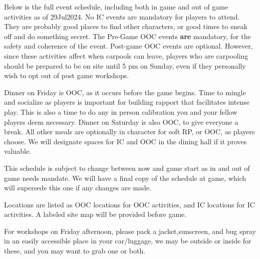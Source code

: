 \documentclass[green]{GL2020}
\begin{document}
\name{\gWeekendSchedule{}}

Below is the full event schedule, including both in game and out of game activities as of 29Jul2024. No IC events are mandatory for players to attend. They are probably good places to find other characters, or good times to sneak off and do something secret. The Pre-Game OOC events \textbf{are} mandatory, for the safety and coherence of the event. Post-game OOC events are optional. However, since these activities affect when carpools can leave, players who are carpooling should be prepared to be on site until 5 pm on Sunday, even if they personally wish to opt out of post game workshops.

Dinner on Friday is OOC, as it occurs before the game begins. Time to mingle and socialize as players is important for building rapport that facilitates intense play. This is also a time to do any in person calibration you and your fellow players deem necessary. Dinner on Saturday is also OOC, to give everyone a break. All other meals are optionally in character for soft RP, or OOC, as players choose. We will designate spaces for IC and OOC in the dining hall if it proves valuable.

This schedule is subject to change between now and game start as in and out of game needs mandate. We will have a final copy of the schedule at game, which will supersede this one if any changes are made.

Locations are listed as OOC locations for OOC activities, and IC locations for IC activities. A labeled site map will be provided before game.


For workshops on Friday afternoon, please pack a jacket,sunscreen, and bug spray in an easily accessible place in your car/luggage, we may be outside or inside for these, and you may want to grab one or both.
\end{document}
